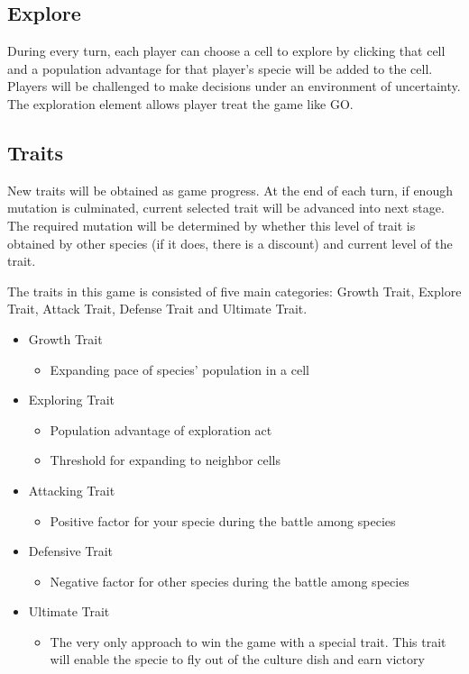\documentclass[12pt,a4paper]{scrartcl}
\begin{document}
\subsection{Explore}

During every turn, each player can choose a cell to explore by clicking that cell and a population advantage for that player's specie will be added to the cell. Players will be challenged to make decisions under an environment of uncertainty. The exploration element allows player treat the game like GO.

\subsection{Traits}

New traits will be obtained as game progress. At the end of each turn, if enough mutation is culminated, current selected trait will be advanced into next stage. The required mutation will be determined by whether this level of trait is obtained by other species (if it does, there is a discount) and current level of the trait. 

The traits in this game is consisted of five main categories: Growth Trait, Explore Trait, Attack Trait, Defense Trait and Ultimate Trait.


\begin{itemize}
	\item Growth Trait
	\begin{itemize}
		\item Expanding pace of species' population in a cell
	\end{itemize}
	\item Exploring Trait
	\begin{itemize}
		\item Population advantage of exploration act
		\item Threshold for expanding to neighbor cells
	\end{itemize}
	\item Attacking Trait
	\begin{itemize}
		\item Positive factor for your specie during the battle among species
	\end{itemize}
	\item Defensive Trait
	\begin{itemize}
		\item Negative factor for other species during the battle among species
	\end{itemize}
	\item Ultimate Trait
	\begin{itemize}
		\item The very only approach to win the game with a special trait. This trait will enable the specie to fly out of the culture dish and earn victory
	\end{itemize}
\end{itemize}
\end{document}
